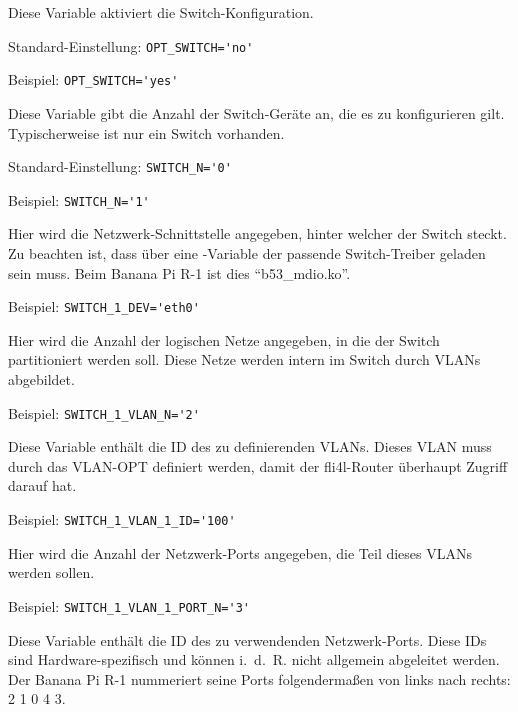 \begin{description}

Diese Variable aktiviert die Switch-Konfiguration.

Standard-Einstellung: \verb+OPT_SWITCH='no'+

Beispiel: \verb+OPT_SWITCH='yes'+


Diese Variable gibt die Anzahl der Switch-Geräte an, die es zu konfigurieren
gilt. Typischerweise ist nur ein Switch vorhanden.

Standard-Einstellung: \verb+SWITCH_N='0'+

Beispiel: \verb+SWITCH_N='1'+


Hier wird die Netzwerk-Schnittstelle angegeben, hinter welcher der Switch
steckt. Zu beachten ist, dass über eine -Variable der passende
Switch-Treiber geladen sein muss. Beim Banana Pi R-1 ist dies ``b53\_mdio.ko''.

Beispiel: \verb+SWITCH_1_DEV='eth0'+


Hier wird die Anzahl der logischen Netze angegeben, in die der Switch
partitioniert werden soll. Diese Netze werden intern im Switch durch VLANs
abgebildet.

Beispiel: \verb+SWITCH_1_VLAN_N='2'+


Diese Variable enthält die ID des zu definierenden VLANs. Dieses VLAN muss
durch das VLAN-OPT definiert werden, damit der fli4l-Router überhaupt Zugriff
darauf hat.

Beispiel: \verb+SWITCH_1_VLAN_1_ID='100'+


Hier wird die Anzahl der Netzwerk-Ports angegeben, die Teil dieses VLANs werden
sollen.

Beispiel: \verb+SWITCH_1_VLAN_1_PORT_N='3'+


Diese Variable enthält die ID des zu verwendenden Netzwerk-Ports. Diese IDs
sind Hardware-spezifisch und können i.~d.~R. nicht allgemein abgeleitet werden.
Der Banana Pi R-1 nummeriert seine Ports folgendermaßen von links nach rechts:
2 1 0 4 3.


\end{description}
